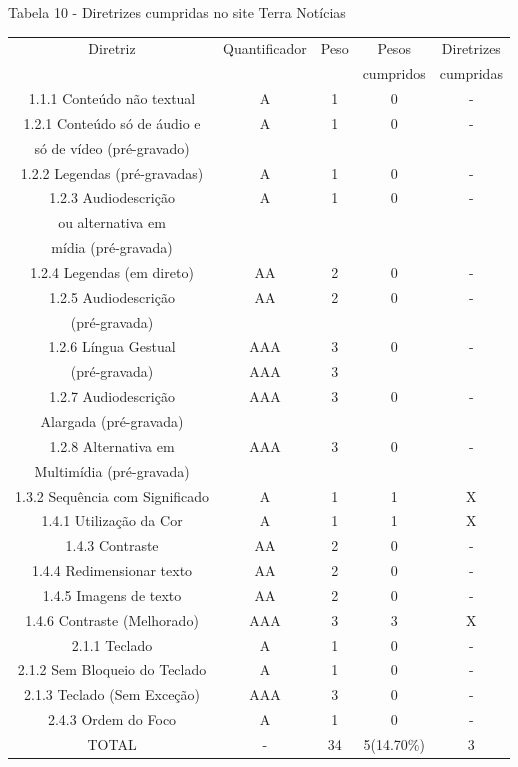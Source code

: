 \documentclass[a4paper]{article}
\begin{document}
\begin{titlepage}
Tabela 10 - Diretrizes cumpridas no site Terra Notícias\\[-1cm]
\begin{center}
	\fontsize{8pt}{8pt}\selectfont	
	\begin{longtable}{|c|c|c|c|c|}
		\hline
		Diretriz & Quantificador & Peso & Pesos & Diretrizes\\
		& & & cumpridos & cumpridas\\
		\hline
		1.1.1 Conteúdo não textual & A & 1 & 0 & - \\
		\hline
		1.2.1 Conteúdo só de áudio e & A & 1 & 0 & - \\
		só de vídeo (pré-gravado) & & & & \\
		\hline
		1.2.2 Legendas (pré-gravadas) & A & 1 & 0 & - \\
		\hline
		1.2.3 Audiodescrição & A & 1 & 0 & - \\
		ou alternativa em & & & & \\
		mídia (pré-gravada) & & & & \\
		\hline
		1.2.4 Legendas (em direto) & AA & 2 & 0 & - \\
		\hline
		1.2.5 Audiodescrição & AA & 2 & 0 & - \\
		(pré-gravada) & & & & \\
		\hline
		1.2.6 Língua Gestual & AAA & 3 & 0 & - \\
		(pré-gravada) & AAA & 3 & & \\
		\hline
		1.2.7 Audiodescrição & AAA & 3 & 0 & - \\
		Alargada (pré-gravada) & & & & \\
		\hline
		1.2.8 Alternativa em & AAA & 3 & 0 & - \\
		Multimídia (pré-gravada) & & & & \\
		\hline
		1.3.2 Sequência com Significado & A & 1 & 1 & X \\
		\hline
		1.4.1 Utilização da Cor & A & 1 & 1 & X \\
		\hline
		1.4.3 Contraste & AA & 2 & 0 & - \\
		\hline
		1.4.4 Redimensionar texto & AA & 2 & 0 & - \\
		\hline
		1.4.5 Imagens de texto & AA & 2 & 0 & - \\
		\hline
		1.4.6 Contraste (Melhorado) & AAA & 3 & 3 & X \\
		\hline
		2.1.1 Teclado & A & 1 & 0 & - \\
		\hline
		2.1.2 Sem Bloqueio do Teclado & A & 1 & 0 & - \\
		\hline
		2.1.3 Teclado (Sem Exceção) & AAA & 3 & 0 & - \\
		\hline
		2.4.3 Ordem do Foco & A & 1 & 0 & - \\
		\hline
		TOTAL & - & 34 & 5(14.70\%) & 3 \\
		\hline
	\end{longtable}
\end{center}


\end{titlepage}
\end{document}
